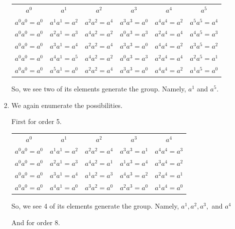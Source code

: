 \documentclass[12pt,letterpaper]{article}
\begin{document}
\begin{enumerate}
\begin{enumerate}
          \begin{tabular}{| c | c | c | c | c | c |}
            \hline
            $a^0$          & $a^1$          & $a^2$          & $a^3$          & $a^4$          & $a^5$          \\
            $a^0a^0 = a^0$ & $a^1a^1 = a^2$ & $a^2a^2 = a^4$ & $a^3a^3 = a^0$ & $a^4a^4 = a^2$ & $a^5a^5 = a^4$ \\
            $a^0a^0 = a^0$ & $a^2a^1 = a^3$ & $a^4a^2 = a^2$ & $a^0a^3 = a^3$ & $a^2a^4 = a^4$ & $a^4a^5 = a^3$ \\
            $a^0a^0 = a^0$ & $a^3a^1 = a^4$ & $a^2a^2 = a^4$ & $a^3a^3 = a^0$ & $a^4a^4 = a^2$ & $a^3a^5 = a^2$ \\
            $a^0a^0 = a^0$ & $a^4a^1 = a^5$ & $a^4a^2 = a^2$ & $a^0a^3 = a^3$ & $a^2a^4 = a^4$ & $a^2a^5 = a^1$ \\
            $a^0a^0 = a^0$ & $a^5a^1 = a^0$ & $a^2a^2 = a^4$ & $a^3a^3 = a^0$ & $a^4a^4 = a^2$ & $a^1a^5 = a^0$ \\
            \hline
          \end{tabular}

          So, we see two of its elements generate the group.
          Namely, $a^1$ and $a^5$.

        \item
          We again enumerate the possibilities.

          First for order 5.

          \begin{tabular}{| c | c | c | c | c |}
            \hline
            $a^0$          & $a^1$          & $a^2$          & $a^3$          & $a^4$          \\
            $a^0a^0 = a^0$ & $a^1a^1 = a^2$ & $a^2a^2 = a^4$ & $a^3a^3 = a^1$ & $a^4a^4 = a^3$ \\
            $a^0a^0 = a^0$ & $a^2a^1 = a^3$ & $a^4a^2 = a^1$ & $a^1a^3 = a^4$ & $a^3a^4 = a^2$ \\
            $a^0a^0 = a^0$ & $a^3a^1 = a^4$ & $a^1a^2 = a^3$ & $a^4a^3 = a^2$ & $a^2a^4 = a^1$ \\
            $a^0a^0 = a^0$ & $a^4a^1 = a^0$ & $a^3a^2 = a^0$ & $a^2a^3 = a^0$ & $a^1a^4 = a^0$ \\
            \hline
          \end{tabular}

          So, we see 4 of its elements generate the group.
          Namely, $a^1, a^2, a^3,$ and $a^4$

          And for order 8.


\end{enumerate}
\end{enumerate}
\end{document}
